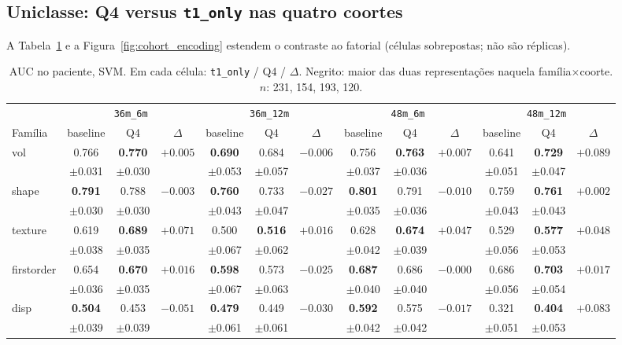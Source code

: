 \documentclass[review]{elsarticle}
\newcommand{\code}[1]{\texttt{#1}}
\begin{document}
\subsection{Uniclasse: Q4 versus \texorpdfstring{\code{t1\_only}}{t1\_only} nas quatro coortes}
\label{subsec:unimodal}

A Tabela~\ref{tab:uni_4} e a Figura~\ref{fig:cohort_encoding} estendem o contraste
ao fatorial (células sobrepostas; não são réplicas).

\begin{table}
	\centering
	\footnotesize
	\setlength{\tabcolsep}{3.5pt}
	\caption{AUC no paciente, SVM.
		Em cada célula: \code{t1\_only} / Q4 / $\Delta$.
		Negrito: maior das duas representações naquela família$\times$coorte.
		$n$: 231, 154, 193, 120.}
	\label{tab:uni_4}
	\begin{tabular}{@{}l ccc ccc ccc ccc@{}}
		\toprule
		& \multicolumn{3}{c}{\code{36m\_6m}} & \multicolumn{3}{c}{\code{36m\_12m}} & \multicolumn{3}{c}{\code{48m\_6m}} & \multicolumn{3}{c}{\code{48m\_12m}} \\
		\cmidrule(lr){2-4}\cmidrule(lr){5-7}\cmidrule(lr){8-10}\cmidrule(lr){11-13}
		Família & baseline & Q4 & $\Delta$ & baseline & Q4 & $\Delta$ & baseline & Q4 & $\Delta$ & baseline & Q4 & $\Delta$ \\
		\midrule
		vol & 0.766 & \textbf{0.770} & $+0.005$ & \textbf{0.690} & 0.684 & $-0.006$ & 0.756 & \textbf{0.763} & $+0.007$ & 0.641 & \textbf{0.729} & $+0.089$ \\
		& $\pm$0.031 & $\pm$0.030 & & $\pm$0.053 & $\pm$0.057 & & $\pm$0.037 & $\pm$0.036 & & $\pm$0.051 & $\pm$0.047 & \\
		shape & \textbf{0.791} & 0.788 & $-0.003$ & \textbf{0.760} & 0.733 & $-0.027$ & \textbf{0.801} & 0.791 & $-0.010$ & 0.759 & \textbf{0.761} & $+0.002$ \\
		& $\pm$0.030 & $\pm$0.030 & & $\pm$0.043 & $\pm$0.047 & & $\pm$0.035 & $\pm$0.036 & & $\pm$0.043 & $\pm$0.043 & \\
		texture & 0.619 & \textbf{0.689} & $+0.071$ & 0.500 & \textbf{0.516} & $+0.016$ & 0.628 & \textbf{0.674} & $+0.047$ & 0.529 & \textbf{0.577} & $+0.048$ \\
		& $\pm$0.038 & $\pm$0.035 & & $\pm$0.067 & $\pm$0.062 & & $\pm$0.042 & $\pm$0.039 & & $\pm$0.056 & $\pm$0.053 & \\
		firstorder & 0.654 & \textbf{0.670} & $+0.016$ & \textbf{0.598} & 0.573 & $-0.025$ & \textbf{0.687} & 0.686 & $-0.000$ & 0.686 & \textbf{0.703} & $+0.017$ \\
		& $\pm$0.036 & $\pm$0.035 & & $\pm$0.067 & $\pm$0.063 & & $\pm$0.040 & $\pm$0.040 & & $\pm$0.056 & $\pm$0.054 & \\
		disp & \textbf{0.504} & 0.453 & $-0.051$ & \textbf{0.479} & 0.449 & $-0.030$ & \textbf{0.592} & 0.575 & $-0.017$ & 0.321 & \textbf{0.404} & $+0.083$ \\
		& $\pm$0.039 & $\pm$0.039 & & $\pm$0.061 & $\pm$0.061 & & $\pm$0.042 & $\pm$0.042 & & $\pm$0.051 & $\pm$0.053 & \\
		\bottomrule
	\end{tabular}
\end{table}
\end{document}
